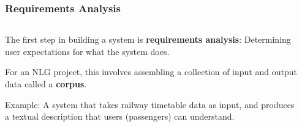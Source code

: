 \begin{frame}
\frametitle{Requirements Analysis}

\begin{columns}

	\begin{column}{0.65\textwidth}
		The first step in building a system is \textbf{requirements analysis}:
		Determining user expectations for what the system does.
		
		\vspace{12pt}
		
		For an NLG project, this	involves assembling a collection
		of input and output data called a \textbf{corpus}.
		
		\vspace{12pt}
		
		Example: A system that takes railway timetable data as input,
		and produces a textual description that users (passengers) can understand.
		
	\end{column}
	
	\begin{column}{0.35\textwidth}
		\begin{center}
		
		\end{center}
	\end{column}

\end{columns}

\end{frame}